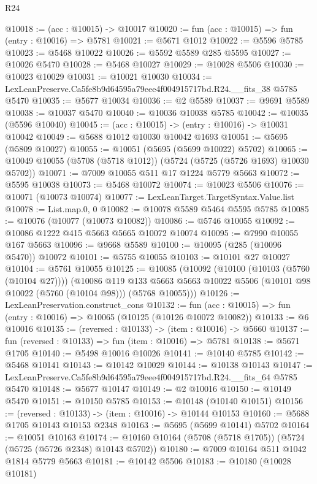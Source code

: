 \begin{lexlean}{R24}
\begin{coremodule}
@10018 := (acc : @10015) -> @10017
@10020 := fun (acc : @10015) => fun (entry : @10016) => @5781
@10021 := @5671 @1012
@10022 := @5596 @5785
@10023 := @5468 @10022
@10026 := @5592 @5589 @285 @5595
@10027 := @10026 @5470
@10028 := @5468 @10027
@10029 := @10028 @5506
@10030 := @10023 @10029
@10031 := @10021 @10030
@10034 := LexLeanPreserve.Ca5fe8b9d64595a79eee4f004915717bd.R24.__fits_38 @5785 @5470
@10035 := @5677 @10034
@10036 := @2 @5589
@10037 := @9691 @5589
@10038 := @10037 @5470
@10040 := @10036 @10038 @5785
@10042 := @10035 (@5596 @10040)
@10045 := (acc : @10015) -> (entry : @10016) -> @10031 @10042
@10049 := @5688 @1012 @10030 @10042 @1693
@10051 := @5695 (@5809 @10027)
@10055 := @10051 (@5695 (@5699 @10022) @5702)
@10065 := @10049 @10055 (@5708 (@5718 @1012)) (@5724 (@5725 (@5726 @1693) @10030 @5702))
@10071 := @7009 @10055 @511 @17 @1224 @5779 @5663
@10072 := @5595 @10038
@10073 := @5468 @10072
@10074 := @10023 @5506
@10076 := @10071 (@10073 @10074)
@10077 := LexLeanTarget.TargetSyntax.Value.list
@10078 := List.map.{0, 0}
@10082 := @10078 @5589 @5464 @5595 @5785
@10085 := @10076 (@10077 (@10073 @10082))
@10086 := @5746 @10055
@10092 := @10086 @1222 @415 @5663 @5665 @10072 @10074
@10095 := @7990 @10055 @167 @5663
@10096 := @9668 @5589
@10100 := @10095 (@285 (@10096 @5470)) @10072
@10101 := @5755 @10055
@10103 := @10101 @27 @10027
@10104 := @5761 @10055
@10125 := @10085
    (@10092
      (@10100 (@10103 (@5760 (@10104 @27))))
      (@10086
        @119
        @133
        @5663
        @5663
        @10022
        @5506
        (@10101 @98 @10022 (@5760 (@10104 @98)))
        (@5768 @10055)))
@10126 := LexLeanPreservation.construct_cons
@10132 := fun (acc : @10015) => fun (entry : @10016) => @10065 (@10125 (@10126 @10072 @10082))
@10133 := @6 @10016
@10135 := (reversed : @10133) -> (item : @10016) -> @5660
@10137 := fun (reversed : @10133) => fun (item : @10016) => @5781
@10138 := @5671 @1705
@10140 := @5498 @10016 @10026
@10141 := @10140 @5785
@10142 := @5468 @10141
@10143 := @10142 @10029
@10144 := @10138 @10143
@10147 := LexLeanPreserve.Ca5fe8b9d64595a79eee4f004915717bd.R24.__fits_64 @5785 @5470
@10148 := @5677 @10147
@10149 := @2 @10016
@10150 := @10149 @5470
@10151 := @10150 @5785
@10153 := @10148 (@10140 @10151)
@10156 := (reversed : @10133) -> (item : @10016) -> @10144 @10153
@10160 := @5688 @1705 @10143 @10153 @2348
@10163 := @5695 (@5699 @10141) @5702
@10164 := @10051 @10163
@10174 := @10160 @10164 (@5708 (@5718 @1705)) (@5724 (@5725 (@5726 @2348) @10143 @5702))
@10180 := @7009 @10164 @511 @1042 @1814 @5779 @5663
@10181 := @10142 @5506
@10183 := @10180 (@10028 @10181)

\end{coremodule}
\end{lexlean}
